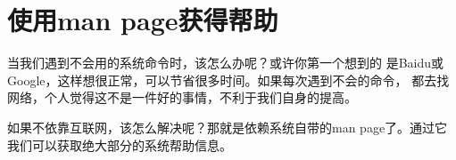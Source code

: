 \section{使用man page获得帮助}
\label{sec:getHelp}

当我们遇到不会用的系统命令时，该怎么办呢？或许你第一个想到的
是Baidu或Google，这样想很正常，可以节省很多时间。如果每次遇到不会的命令，
都去找网络，个人觉得这不是一件好的事情，不利于我们自身的提高。

如果不依靠互联网，该怎么解决呢？那就是依赖系统自带的man page了。通过它我们可以获取绝大部分的系统帮助信息。
